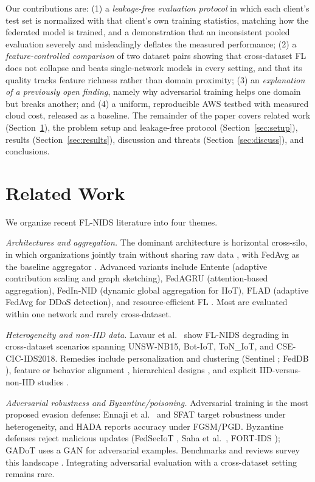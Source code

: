 \documentclass[conference,onecolumn]{IEEEtran}
\begin{document}
Our contributions are: (1) a \emph{leakage-free evaluation protocol} in which each client's test set
is normalized with that client's own training statistics, matching how the federated model is trained,
and a demonstration that an inconsistent pooled evaluation severely and misleadingly deflates the
measured performance; (2) a \emph{feature-controlled comparison} of two dataset pairs showing that
cross-dataset FL does not collapse and beats single-network models in every setting, and that its
quality tracks feature richness rather than domain proximity;
(3) an \emph{explanation of a previously open finding}, namely why adversarial training helps one
domain but breaks another; and (4) a uniform, reproducible AWS testbed with measured cloud cost,
released as a baseline. The remainder of the paper covers related work (Section~\ref{sec:related}),
the problem setup and leakage-free protocol (Section~\ref{sec:setup}), results
(Section~\ref{sec:results}), discussion and threats (Section~\ref{sec:discuss}), and conclusions.

\section{Related Work}
\label{sec:related}
We organize recent FL-NIDS literature into four themes.

\textit{Architectures and aggregation.} The dominant architecture is horizontal cross-silo, in which
organizations jointly train without sharing raw data \cite{b1,b11}, with FedAvg as the baseline
aggregator \cite{b1}. Advanced variants include Entente \cite{b11} (adaptive contribution scaling and
graph sketching), FedAGRU \cite{b12} (attention-based aggregation), FedIn-NID \cite{b13} (dynamic global aggregation
for IIoT), FLAD \cite{b14} (adaptive FedAvg for DDoS detection), and resource-efficient FL
\cite{b15}. Most are evaluated within one network and rarely cross-dataset.

\textit{Heterogeneity and non-IID data.} Lavaur et al.\ \cite{b5} show FL-NIDS degrading in
cross-dataset scenarios spanning UNSW-NB15, Bot-IoT, ToN\_IoT, and CSE-CIC-IDS2018. Remedies include
personalization and clustering (Sentinel \cite{b16}; FedDB \cite{b17}), feature or behavior alignment
\cite{b18,b11}, hierarchical designs \cite{b19}, and explicit IID-versus-non-IID studies \cite{b20}.

\textit{Adversarial robustness and Byzantine/poisoning.} Adversarial training is the most proposed
evasion defense: Ennaji et al.\ \cite{b21} and SFAT \cite{b6} target robustness under heterogeneity,
and HADA \cite{b22} reports accuracy under FGSM/PGD. Byzantine defenses reject malicious updates
(FedSecIoT \cite{b23}, Saha et al.\ \cite{b7}, FORT-IDS \cite{b24}); GADoT \cite{b25} uses a GAN for
adversarial examples. Benchmarks and reviews survey this landscape \cite{b26,b8,b27}. Integrating
adversarial evaluation with a cross-dataset setting remains rare.
\end{document}
